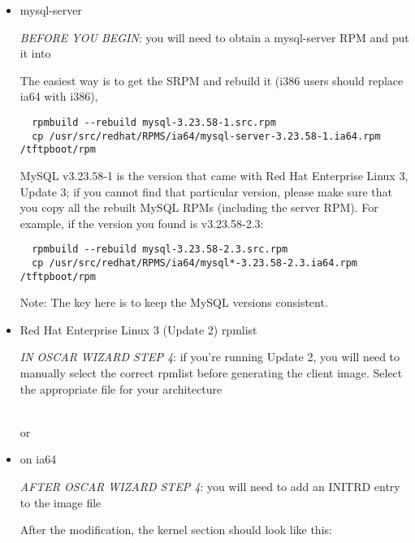 \begin{itemize}

\item mysql-server

\emph{BEFORE YOU BEGIN}: you will need to obtain a mysql-server RPM and put it into


The easiest way is to get the SRPM and rebuild it (i386
users should replace ia64 with i386),

\begin{verbatim}
  rpmbuild --rebuild mysql-3.23.58-1.src.rpm
  cp /usr/src/redhat/RPMS/ia64/mysql-server-3.23.58-1.ia64.rpm /tftpboot/rpm
\end{verbatim}

MySQL v3.23.58-1 is the version that came with Red Hat Enterprise Linux 3, Update 3; if you cannot
find that particular version, please make sure that you copy all the
rebuilt MySQL RPMs (including the server RPM).  For example, if the
version you found is v3.23.58-2.3:

\begin{verbatim}
  rpmbuild --rebuild mysql-3.23.58-2.3.src.rpm
  cp /usr/src/redhat/RPMS/ia64/mysql*-3.23.58-2.3.ia64.rpm /tftpboot/rpm
\end{verbatim}

Note: The key here is to keep the MySQL versions consistent.

\item Red Hat Enterprise Linux 3 (Update 2) rpmlist

\emph{IN OSCAR WIZARD STEP 4}: if you're running Update 2, you will
need to manually select the correct rpmlist before generating the client image.
Select the appropriate file for your architecture

  \ \\  %
or
  \ \\  %


\item {} on ia64

\emph{AFTER OSCAR WIZARD STEP 4}: you will need to add an INITRD entry to the image
file


After the modification, the kernel section should look like this:


\end{itemize}

